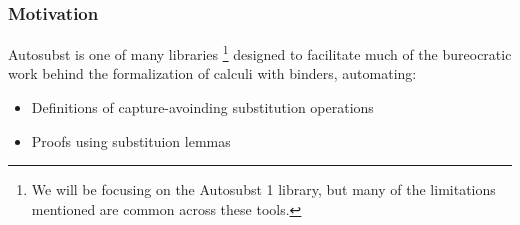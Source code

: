\begin{frame}
  \frametitle{Motivation}
  
  Autosubst is one of many libraries
  \footnote{We will be focusing on the Autosubst 1 library, but many of the limitations mentioned are common across these tools.}
  designed to facilitate much of the bureocratic work behind the formalization of calculi with binders, automating:
  \begin{itemize}
  \item<2-> Definitions of capture-avoinding substitution operations
  \item<3-> Proofs using substituion lemmas  
  \end{itemize}


\end{frame}
